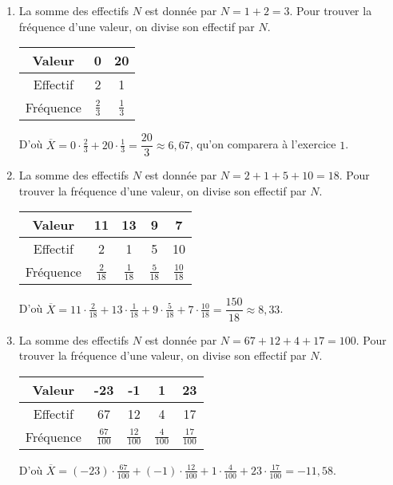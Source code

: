 {\begin{enumerate}
			La moyenne est la somme des produits Valeur $\times$ Fréquence.
			D'où $\overline{X} = 0 \cdot \frac13 + 20 \cdot \frac23 =\dfrac{40}3 \approx 13,33$, qu'on comparera à l'exercice $1$.
			
		\item 
			La somme des effectifs $N$ est donnée par $N = 1+2 = 3$.
			Pour trouver la fréquence d'une valeur, on divise son effectif par $N$.
			
			\begin{tabular}{|c|c|c|}\hline
			Valeur   & 0 & 20 \\ \hline
			Effectif & 2 & 1  \\ \hline
			Fréquence & $\frac23$ & $\frac13$ \\ \hline
			\end{tabular}
			
			D'où $\overline{X} = 0 \cdot \frac23 + 20 \cdot \frac13 =\dfrac{20}3 \approx 6,67$, qu'on comparera à l'exercice $1$.
			
		\item 
			La somme des effectifs $N$ est donnée par $N = 2+1+5+10 = 18$.
			Pour trouver la fréquence d'une valeur, on divise son effectif par $N$.
			
			\begin{tabular}{|c|c|c|c|c|}\hline
			Valeur   & 11 & 13 & 9 & 7 \\ \hline
			Effectif & 2 & 1 & 5 & 10 \\ \hline
			Fréquence & $\frac2{18}$ & $\frac1{18}$ & $\frac5{18}$ & $\frac{10}{18}$  \\ \hline
			\end{tabular}
			
			D'où $\overline{X} = 11\cdot\frac2{18} + 13\cdot \frac1{18} + 9\cdot \frac5{18} + 7\cdot\frac{10}{18} = \dfrac{150}{18} \approx 8,33 $.
			
		\item 
			La somme des effectifs $N$ est donnée par $N = 67+12+4+17 = 100$.
			Pour trouver la fréquence d'une valeur, on divise son effectif par $N$.
			
			\begin{tabular}{|c|c|c|c|c|}\hline
			Valeur   & -23 & -1 & 1 & 23 \\ \hline
			Effectif & 67 & 12 & 4 & 17 \\ \hline
			Fréquence & $\frac{67}{100}$ & $\frac{12}{100}$ & $\frac{4}{100}$ & $\frac{17}{100}$ \\ \hline
			\end{tabular}
			
			D'où $\overline{X} = (-23) \cdot \frac{67}{100} + (-1)\cdot \frac{12}{100} + 1\cdot \frac{4}{100} + 23\cdot \frac{17}{100} = -11,58$.

	\end{enumerate}
}

